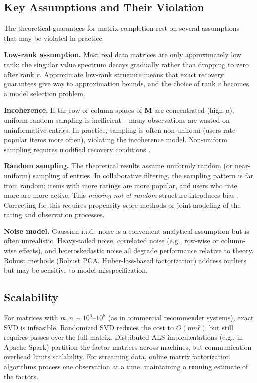 \documentclass[conference]{IEEEtran}
\begin{document}
\subsection{Key Assumptions and Their Violation}

The theoretical guarantees for matrix completion rest on several assumptions that may be violated in practice.

\textbf{Low-rank assumption.} Most real data matrices are only approximately low rank; the singular value spectrum decays gradually rather than dropping to zero after rank $r$. Approximate low-rank structure means that exact recovery guarantees give way to approximation bounds, and the choice of rank $r$ becomes a model selection problem.

\textbf{Incoherence.} If the row or column spaces of $\mathbf{M}$ are concentrated (high $\mu$), uniform random sampling is inefficient -- many observations are wasted on uninformative entries. In practice, sampling is often non-uniform (users rate popular items more often), violating the incoherence model. Non-uniform sampling requires modified recovery conditions \cite{chen2015completing}.

\textbf{Random sampling.} The theoretical results assume uniformly random (or near-uniform) sampling of entries. In collaborative filtering, the sampling pattern is far from random: items with more ratings are more popular, and users who rate more are more active. This \emph{missing-not-at-random} structure introduces bias \cite{marlin2009collaborative}. Correcting for this requires propensity score methods or joint modeling of the rating and observation processes.

\textbf{Noise model.} Gaussian i.i.d.\ noise is a convenient analytical assumption but is often unrealistic. Heavy-tailed noise, correlated noise (e.g., row-wise or column-wise effects), and heteroskedastic noise all degrade performance relative to theory. Robust methods (Robust PCA, Huber-loss-based factorization) address outliers but may be sensitive to model misspecification.

\subsection{Scalability}

For matrices with $m, n \sim 10^6$--$10^8$ (as in commercial recommender systems), exact SVD is infeasible. Randomized SVD \cite{halko2011finding} reduces the cost to $O(mn\hat{r})$ but still requires passes over the full matrix. Distributed ALS implementations (e.g., in Apache Spark) partition the factor matrices across machines, but communication overhead limits scalability. For streaming data, online matrix factorization algorithms \cite{mairal2010online} process one observation at a time, maintaining a running estimate of the factors.
\end{document}

